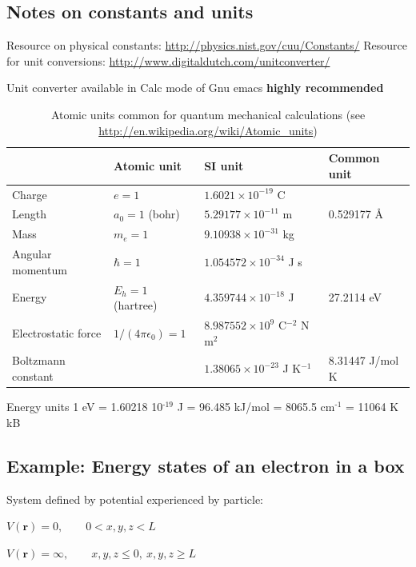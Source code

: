 \documentclass[11pt]{article}
\begin{document}
\subsection{Notes on constants and units}
\label{sec-2-3}
Resource on physical constants: \url{http://physics.nist.gov/cuu/Constants/}
Resource for unit conversions: \url{http://www.digitaldutch.com/unitconverter/}

Unit converter available in Calc mode of Gnu emacs \textbf{highly recommended}

\begin{table}[htb]
\caption{Atomic units common for quantum mechanical calculations (see \url{http://en.wikipedia.org/wiki/Atomic_units})}
\centering
\begin{tabular}{llll}
\hline
 & Atomic unit & SI unit & Common unit\\
\hline
Charge & $e = 1$ & $1.6021 \times 10^{-19}$ C & \\
Length & $a_0 = 1$ (bohr) & $5.29177 \times 10^{-11}$ m & 0.529177 \AA{}\\
Mass & $m_e = 1$ & $9.10938 \times 10^{-31}$ kg & \\
Angular momentum & $\hbar = 1$ & $1.054 572 \times 10^{-34}$ J s & \\
Energy & $E_h = 1$ (hartree) & $4.359744 \times 10^{-18}$ J & 27.2114 eV\\
Electrostatic force & $1/(4\pi\epsilon_0) = 1$ & $8.987552 \times 10^9$ C$^{-2}$ N m$^{\text{2}}$ & \\
Boltzmann constant &  & $1.38065 \times 10^{-23}$ J K$^{-1}$ & 8.31447 J/mol K\\
\hline
\end{tabular}
\end{table}


\begin{center}
Energy units
1 eV = 1.60218\texttimes{} 10$^{\text{-19}}$ J = 96.485 kJ/mol = 8065.5 cm$^{\text{-1}}$ = 11064 K kB
\end{center}

\subsection{Example: Energy states of an electron in a box}
\label{sec-2-4}
System defined by potential experienced by particle:

$V(\mathbf{r}) = 0,\qquad 0 < x,y,z < L$

$V(\mathbf{r}) = \infty,\qquad x,y,z \leq 0,\ x,y,z \geq L$
\end{document}
